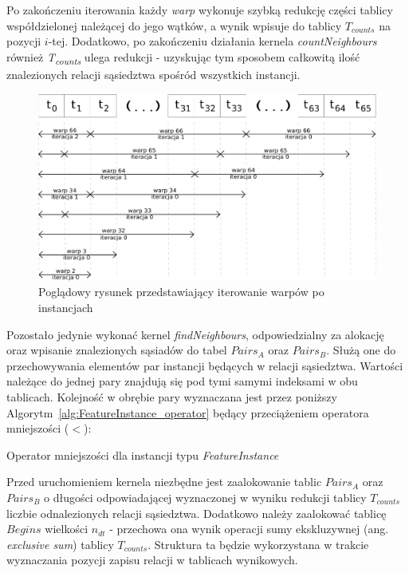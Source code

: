 \documentclass[12pt]{article}
\begin{document}
Po zakończeniu iterowania każdy \textit{warp} wykonuje szybką redukcję części tablicy współdzielonej należącej do jego wątków, a wynik wpisuje do tablicy \textit{$ T_{counts} $} na pozycji $i$-tej. Dodatkowo, po zakończeniu działania kernela  \textit{countNeighbours} również \textit{T\textsubscript{counts}} ulega redukcji - uzyskując tym sposobem całkowitą ilość znalezionych relacji sąsiedztwa spośród wszystkich instancji.

\begin{figure}[H]
\centering
\includegraphics[width=\textwidth]{planesweep.eps}
\caption{Poglądowy rysunek przedstawiający iterowanie warpów po instancjach}
\end{figure}

Pozostało jedynie wykonać kernel \textit{findNeighbours}, odpowiedzialny za alokację oraz wpisanie znalezionych sąsiadów do tabel $ Pairs_{A} $ oraz $ Pairs_{B} $. Służą one do przechowywania elementów par instancji będących w relacji sąsiedztwa. Wartości należące do jednej pary znajdują się pod tymi samymi indeksami w obu tablicach. Kolejność w obrębie pary wyznaczana jest przez poniższy Algorytm~\ref{alg:FeatureInstance_operator} będący przeciążeniem operatora mniejszości ($ < $):

\begin{algorithm}
\caption{Operator mniejszości dla instancji typu \textit{FeatureInstance}}
\label{alg:FeatureInstance_operator}
\end{algorithm}

Przed uruchomieniem kernela niezbędne jest zaalokowanie tablic $ Pairs_{A} $ oraz $ Pairs_{B}$ o długości odpowiadającej wyznaczonej w wyniku redukcji tablicy $ T_{counts} $ liczbie odnalezionych relacji sąsiedztwa. Dodatkowo należy zaalokować tablicę $ Begins $ wielkości $ n_{dt} $ - przechowa ona wynik operacji sumy ekskluzywnej (ang. \textit{exclusive sum}) tablicy $ T_{counts} $. Struktura ta będzie wykorzystana w trakcie wyznaczania pozycji zapisu relacji w tablicach wynikowych.
\end{document}

